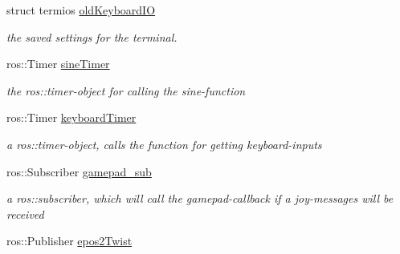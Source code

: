 \begin{DoxyCompactItemize}
struct termios \hyperlink{structSampleMoving_1_1sampleMovingSettingStruct_ada495f188f63cdcfef79f02ed3cce32b}{old\-Keyboard\-I\-O}
\begin{DoxyCompactList}\small\item\em the saved settings for the terminal. \end{DoxyCompactList}\item 
\hypertarget{structSampleMoving_1_1sampleMovingSettingStruct_a10791b15fe90cef7888ae50740d871c3}{ros\-::\-Timer \hyperlink{structSampleMoving_1_1sampleMovingSettingStruct_a10791b15fe90cef7888ae50740d871c3}{sine\-Timer}}\label{structSampleMoving_1_1sampleMovingSettingStruct_a10791b15fe90cef7888ae50740d871c3}

\begin{DoxyCompactList}\small\item\em the ros\-::timer-\/object for calling the sine-\/function \end{DoxyCompactList}\item 
\hypertarget{structSampleMoving_1_1sampleMovingSettingStruct_a792129ba4ea06e5aa6993f82e0ce5d7b}{ros\-::\-Timer \hyperlink{structSampleMoving_1_1sampleMovingSettingStruct_a792129ba4ea06e5aa6993f82e0ce5d7b}{keyboard\-Timer}}\label{structSampleMoving_1_1sampleMovingSettingStruct_a792129ba4ea06e5aa6993f82e0ce5d7b}

\begin{DoxyCompactList}\small\item\em a ros\-::timer-\/object, calls the function for getting keyboard-\/inputs \end{DoxyCompactList}\item 
\hypertarget{structSampleMoving_1_1sampleMovingSettingStruct_a0f3fc50e06f462a7a1e88053be100054}{ros\-::\-Subscriber \hyperlink{structSampleMoving_1_1sampleMovingSettingStruct_a0f3fc50e06f462a7a1e88053be100054}{gamepad\-\_\-sub}}\label{structSampleMoving_1_1sampleMovingSettingStruct_a0f3fc50e06f462a7a1e88053be100054}

\begin{DoxyCompactList}\small\item\em a ros\-::subscriber, which will call the gamepad-\/callback if a joy-\/messages will be received \end{DoxyCompactList}\item 
\hypertarget{structSampleMoving_1_1sampleMovingSettingStruct_a5029964881beda76675cce0dd7a3d21f}{ros\-::\-Publisher \hyperlink{structSampleMoving_1_1sampleMovingSettingStruct_a5029964881beda76675cce0dd7a3d21f}{epos2\-Twist}}\label{structSampleMoving_1_1sampleMovingSettingStruct_a5029964881beda76675cce0dd7a3d21f}


\end{DoxyCompactItemize}
